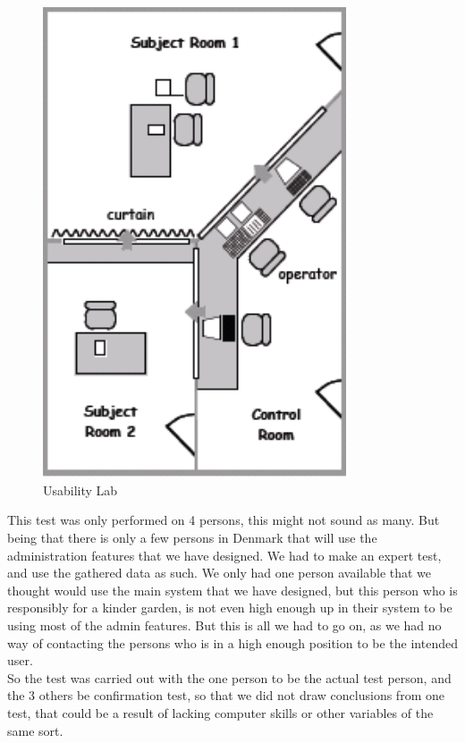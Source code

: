 \begin{figure}[htbp]
	\centering
		\includegraphics[width=0.80\textwidth]{images/usabilitylab.png}
	\caption{Usability Lab}
	\label{fig:usabilitylab}
\end{figure}

This test was only performed on 4 persons, this might not sound as many. But being that there is only a few persons in Denmark that will use the administration features that we have designed. We had to make an expert test, and use the gathered data as such. We only had one person available that we thought would use the main system that we have designed, but this person who is responsibly for a kinder garden, is not even high enough up in their system to be using most of the admin features. But this is all we had to go on, as we had no way of contacting the persons who is in a high enough position to be the intended user.\\
So the test was carried out with the one person to be the actual test person, and the 3 others be confirmation test, so that we did not draw conclusions from one test, that could be a result of lacking computer skills or other variables of the same sort.
	
